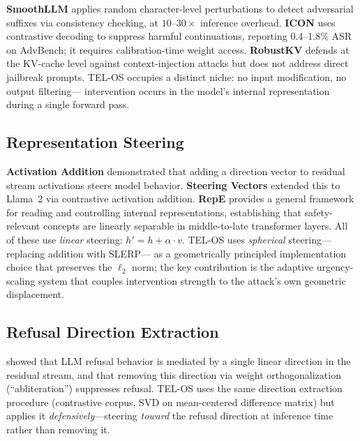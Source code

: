 \documentclass{article}
\begin{document}
\textbf{SmoothLLM} \citep{robey2023smoothllm} applies random character-level
perturbations to detect adversarial suffixes via consistency checking, at
$10$--$30\times$ inference overhead.
\textbf{ICON} \citep{zheng2024icon} uses contrastive decoding to suppress harmful
continuations, reporting 0.4--1.8\% ASR on AdvBench; it requires calibration-time
weight access.
\textbf{RobustKV} \citep{ding2024robustkv} defends at the KV-cache level against
context-injection attacks but does not address direct jailbreak prompts.
TEL-OS occupies a distinct niche: no input modification, no output filtering---
intervention occurs in the model's internal representation during a single forward
pass.

\subsection{Representation Steering}

\textbf{Activation Addition} \citep{turner2023activation} demonstrated that
adding a direction vector to residual stream activations steers model behavior.
\textbf{Steering Vectors} \citep{rimsky2024steering} extended this to Llama~2 via
contrastive activation addition.
\textbf{RepE} \citep{zou2023representation} provides a general framework for
reading and controlling internal representations, establishing that safety-relevant
concepts are linearly separable in middle-to-late transformer layers.
All of these use \textit{linear} steering: $h' = h + \alpha \cdot v$.
TEL-OS uses \textit{spherical} steering---replacing addition with SLERP---
as a geometrically principled implementation choice that preserves the
$\ell_2$ norm; the key contribution is the adaptive urgency-scaling system
that couples intervention strength to the attack's own geometric displacement.

\subsection{Refusal Direction Extraction}

\citet{arditi2024refusal} showed that LLM refusal behavior is mediated by a single
linear direction in the residual stream, and that removing this direction via weight
orthogonalization (``abliteration'') suppresses refusal.
TEL-OS uses the same direction extraction procedure (contrastive corpus, SVD on
mean-centered difference matrix) but applies it \textit{defensively}---steering
\textit{toward} the refusal direction at inference time rather than removing it.
\end{document}
